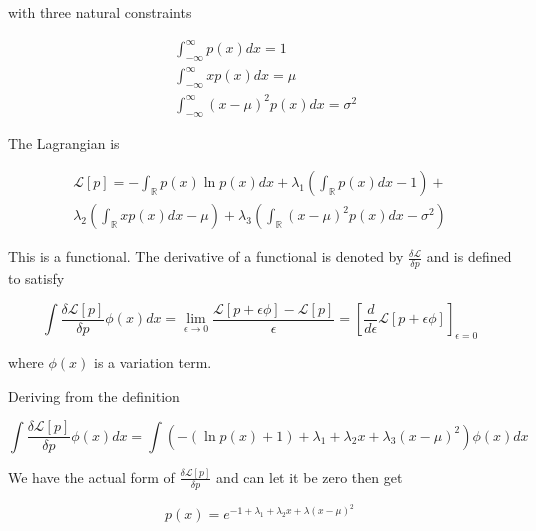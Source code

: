 \documentclass{article}
\begin{document}
            with three natural constraints

            \begin{align*}
                &\int_{-\infty}^\infty p(x) dx = 1 \\
                &\int_{-\infty}^\infty x p(x) dx = \mu \\
                &\int_{-\infty}^\infty (x-\mu)^2 p(x) dx = \sigma^2
            \end{align*}

            The Lagrangian is

            \begin{multline*}
                 \mathcal{L}[p] = -\int_{\mathbb{R}} p(x) \ln p(x) dx +
                 \lambda_1 \left( \int_{\mathbb{R}} p(x) dx - 1 \right) + \\
                 \lambda_2 \left( \int_{\mathbb{R}} x p(x) dx - \mu \right) +
                 \lambda_3 \left( \int_{\mathbb{R}} (x - \mu)^2 p(x) dx - \sigma^2 \right)
            \end{multline*}

            This is a functional. The derivative of a functional is
            denoted by $ \frac{\delta \mathcal{L}}{\delta p} $ and is defined to satisfy

            \begin{equation*}
                 \int \frac{\delta \mathcal{L}[p]}{\delta p} \phi(x) dx =
                 \lim_{\epsilon \rightarrow 0}\frac{\mathcal{L}[p + \epsilon
                 \phi] - \mathcal{L}[p]}{\epsilon} = 
                 \left[
                     \frac{d}{d \epsilon} \mathcal{L}[p + \epsilon \phi]
                 \right]_{\epsilon = 0}
            \end{equation*}

            where $ \phi(x) $ is a variation term.

            Deriving from the definition

            \begin{equation*}
                 \int \frac{\delta \mathcal{L}[p]}{\delta p} \phi(x) dx = \int 
                 \left( - ( \ln p(x) + 1 ) + \lambda_1 + \lambda_2 x +
                 \lambda_3 (x - \mu)^2 \right) \phi(x) dx
            \end{equation*}

            We have the actual form of $ \frac{\delta \mathcal{L}[p]}{\delta p} $ and can let it be zero then get

            \begin{equation*}
                 p(x) = e^{ -1 + \lambda_1 + \lambda_2 x + \lambda(x - \mu)^2 }
            \end{equation*}
\end{document}
